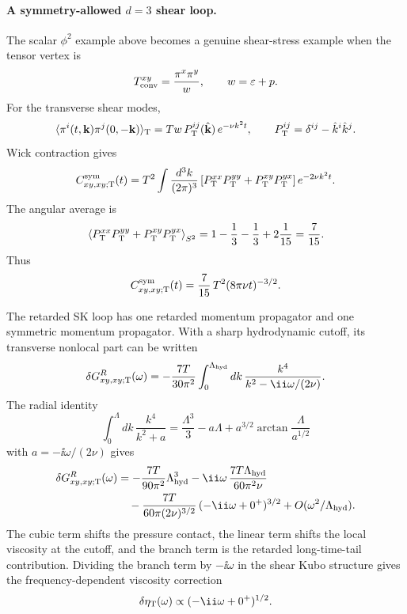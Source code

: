 \paragraph{A symmetry-allowed \(d=3\) shear loop.}
The scalar \(\phi^2\) example above becomes a genuine shear-stress example
when the tensor vertex is
\[
  T^{xy}_{\rm conv}
  =
  \frac{\pi^x\pi^y}{w},
  \qquad
  w=\varepsilon+p .
\]
For the transverse shear modes,
\[
  \langle\pi^i(t,\mathbf k)\pi^j(0,-\mathbf k)\rangle_{\rm T}
  =
  T w\,P_{\rm T}^{ij}(\hat{\mathbf k})\,e^{-\nu k^2t},
  \qquad
  P_{\rm T}^{ij}=\delta^{ij}-\hat k^i\hat k^j .
\]
Wick contraction gives
\[
  C^{\rm sym}_{xy,xy;{\rm T}}(t)
  =
  T^2\int\frac{d^3k}{(2\pi)^3}
  \left[
    P_{\rm T}^{xx}P_{\rm T}^{yy}
    +
    P_{\rm T}^{xy}P_{\rm T}^{yx}
  \right]e^{-2\nu k^2t}.
\]
The angular average is
\begin{equation}
  \left\langle
    P_{\rm T}^{xx}P_{\rm T}^{yy}
    +
    P_{\rm T}^{xy}P_{\rm T}^{yx}
  \right\rangle_{S^2}
  =
  1-\frac13-\frac13+2\frac1{15}
  =
  \frac7{15}.
  \label{eq:hydro-fluct-transverse-angular-seven-fifteenths}
\end{equation}
Thus
\begin{equation}
  C^{\rm sym}_{xy,xy;{\rm T}}(t)
  =
  \frac7{15}\,T^2(8\pi\nu t)^{-3/2}.
  \label{eq:hydro-fluct-shear-transverse-tail}
\end{equation}

The retarded SK loop has one retarded momentum propagator and one symmetric
momentum propagator.  With a sharp hydrodynamic cutoff, its transverse
nonlocal part can be written
\begin{equation}
  \delta G^R_{xy,xy;{\rm T}}(\omega)
  =
  -\frac{7T}{30\pi^2}
  \int_0^{\Lambda_{\rm hyd}}dk\,
  \frac{k^4}{k^2-\ii\omega/(2\nu)} .
  \label{eq:hydro-fluct-shear-retarded-radial-integral}
\end{equation}
The radial identity
\[
  \int_0^\Lambda dk\,\frac{k^4}{k^2+a}
  =
  \frac{\Lambda^3}{3}-a\Lambda+a^{3/2}
  \arctan\frac{\Lambda}{a^{1/2}}
\]
with \(a=-\ii\omega/(2\nu)\) gives
\begin{align}
  \delta G^R_{xy,xy;{\rm T}}(\omega)
  &=
  -\frac{7T}{90\pi^2}\Lambda_{\rm hyd}^3
  -\ii\omega\,\frac{7T\Lambda_{\rm hyd}}{60\pi^2\nu}
  \nonumber\\
  &\quad
  -\frac{7T}{60\pi(2\nu)^{3/2}}\,
  (-\ii\omega+0^+)^{3/2}
  +O(\omega^2/\Lambda_{\rm hyd}) .
  \label{eq:hydro-fluct-shear-retarded-three-halves}
\end{align}
The cubic term shifts the pressure contact, the linear term shifts the local
viscosity at the cutoff, and the branch term is the retarded long-time-tail
contribution.  Dividing the branch term by \(-\ii\omega\) in the shear Kubo
structure gives the frequency-dependent viscosity correction
\[
  \delta\eta_{\rm T}(\omega)
  \propto
  (-\ii\omega+0^+)^{1/2}.
\]

